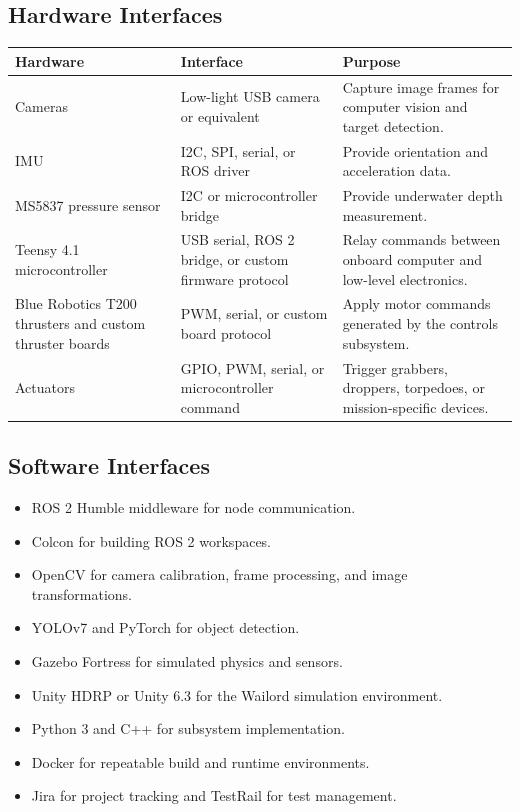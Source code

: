 \documentclass[12pt]{article}
\begin{document}
\subsection{Hardware Interfaces}
\begin{longtable}{|p{}|p{}|p{}|}
\hline
\textbf{Hardware} & \textbf{Interface} & \textbf{Purpose} \\
\hline
Cameras & Low-light USB camera or equivalent & Capture image frames for computer vision and target detection. \\
\hline
IMU & I2C, SPI, serial, or ROS driver & Provide orientation and acceleration data. \\
\hline
MS5837 pressure sensor & I2C or microcontroller bridge & Provide underwater depth measurement. \\
\hline
Teensy 4.1 microcontroller & USB serial, ROS 2 bridge, or custom firmware protocol & Relay commands between onboard computer and low-level electronics. \\
\hline
Blue Robotics T200 thrusters and custom thruster boards & PWM, serial, or custom board protocol & Apply motor commands generated by the controls subsystem. \\
\hline
Actuators & GPIO, PWM, serial, or microcontroller command & Trigger grabbers, droppers, torpedoes, or mission-specific devices. \\
\hline
\end{longtable}

\subsection{Software Interfaces}
\begin{itemize}[leftmargin=*]
  \item ROS 2 Humble middleware for node communication.
  \item Colcon for building ROS 2 workspaces.
  \item OpenCV for camera calibration, frame processing, and image transformations.
  \item YOLOv7 and PyTorch for object detection.
  \item Gazebo Fortress for simulated physics and sensors.
  \item Unity HDRP or Unity 6.3 for the Wailord simulation environment.
  \item Python 3 and C++ for subsystem implementation.
  \item Docker for repeatable build and runtime environments.
  \item Jira for project tracking and TestRail for test management.
\end{itemize}
\end{document}
